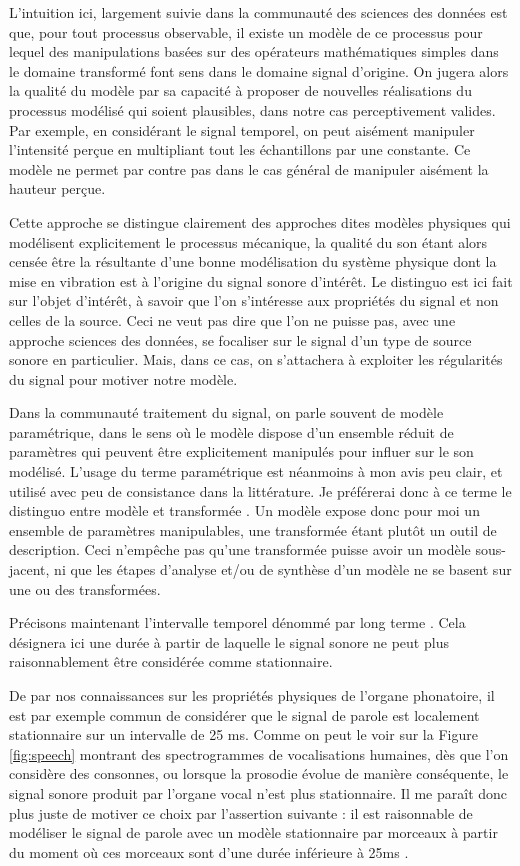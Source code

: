 L'intuition ici, largement suivie dans la communauté des sciences des données est que, pour tout processus observable, il existe un modèle de ce processus pour lequel des manipulations basées sur des opérateurs mathématiques simples dans le domaine transformé \og font sens \fg dans le domaine \fg signal \og d'origine. On jugera alors la qualité du modèle par sa capacité à proposer de nouvelles réalisations du processus modélisé qui soient plausibles, dans notre cas perceptivement valides. Par exemple, en considérant le signal temporel, on peut aisément manipuler l'intensité perçue en multipliant tout les échantillons par une constante. Ce modèle ne permet par contre pas dans le cas général de manipuler aisément la hauteur perçue.

Cette approche se distingue clairement des approches dites \og modèles physiques \fg qui modélisent explicitement le processus mécanique, la qualité du son étant alors censée être la résultante d'une bonne modélisation du système physique dont la mise en vibration est à l'origine du signal sonore d'intérêt. Le distinguo est ici fait sur l'objet d'intérêt, à savoir que l'on s'intéresse aux propriétés du signal et non celles de la source. Ceci ne veut pas dire que l'on ne puisse pas, avec une approche sciences des données, se focaliser sur le signal d'un type de source sonore en particulier. Mais, dans ce cas, on s'attachera à exploiter les régularités du signal pour motiver notre modèle.

Dans la communauté traitement du signal, on parle souvent de modèle paramétrique, dans le sens où le modèle dispose d'un ensemble réduit de paramètres qui peuvent être explicitement manipulés pour influer sur le son modélisé. L'usage du terme \og paramétrique \fg est néanmoins à mon avis peu clair, et utilisé avec peu de consistance dans la littérature. Je préférerai donc à ce terme le distinguo entre \og modèle \fg et \og transformée \fg. Un modèle expose donc pour moi un ensemble de paramètres manipulables, une transformée étant plutôt un outil de description. Ceci n'empêche pas qu'une transformée puisse avoir un modèle sous-jacent, ni que les étapes d'analyse et/ou de synthèse d'un modèle ne se basent sur une ou des transformées.

Précisons maintenant l'intervalle temporel dénommé par \og long terme \fg. Cela désignera ici une durée à partir de laquelle le signal sonore ne peut plus raisonnablement être considérée comme stationnaire.

De par nos connaissances sur les propriétés physiques de l'organe phonatoire, il est par exemple commun de considérer que le signal de parole est localement stationnaire sur un intervalle de 25 ms. Comme on peut le voir sur la Figure \ref{fig:speech} montrant des spectrogrammes de vocalisations humaines\cite{ladefoged2014course}, dès que l'on considère des consonnes, ou lorsque la prosodie évolue de manière conséquente, le signal sonore produit par l'organe vocal n'est plus stationnaire. Il me paraît donc plus juste de motiver ce choix par l'assertion suivante : \og il est raisonnable de modéliser le signal de parole avec un modèle stationnaire par morceaux à partir du moment où ces morceaux sont d'une durée inférieure à 25ms \fg.

